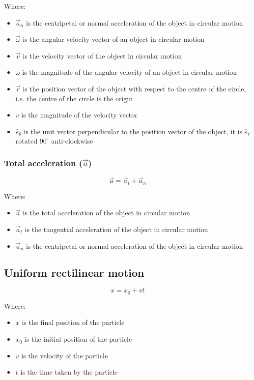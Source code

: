 \documentclass[11pt]{article}
\begin{document}
Where:
\begin{itemize}
\item \(\vec{a}_n\) is the centripetal or normal acceleration of the object in circular motion
\item \(\vec{\omega}\) is the angular velocity vector of an object in circular motion
\item \(\vec{v}\) is the velocity vector of the object in circular motion
\item \(\omega\) is the magnitude of the angular velocity of an object in circular motion
\item \(\vec{r}\) is the position vector of the object with respect to the centre of the circle, i.e. the centre of the circle is the origin
\item \(v\) is the magnitude of the velocity vector
\item \(\hat{e}_{\theta}\) is the unit vector perpendicular to the position vector of the object, it is \(\hat{e}_r\) rotated \(90^{\circ}\) anti-clockwise
\end{itemize}

\subsubsection{Total acceleration (\(\vec{a}\))}
\label{sec:org1f4f7fb}
\[\vec{a} = \vec{a}_t + \vec{a}_n\]

Where:
\begin{itemize}
\item \(\vec{a}\) is the total acceleration of the object in circular motion
\item \(\vec{a}_t\) is the tangential acceleration of the object in circular motion
\item \(\vec{a}_n\) is the centripetal or normal acceleration of the object in circular motion
\end{itemize}

\subsection{Uniform rectilinear motion}
\label{sec:org26db264}
\[x = x_0 + vt\]

Where:
\begin{itemize}
\item \(x\) is the final position of the particle
\item \(x_0\) is the initial position of the particle
\item \(v\) is the velocity of the particle
\item \(t\) is the time taken by the particle
\end{itemize}
\end{document}
